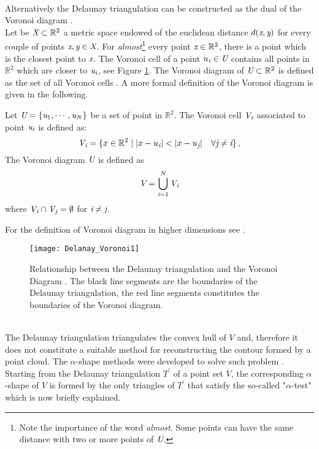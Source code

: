 \\ \indent Alternatively the Delaunay triangulation can be constructed as the dual of the Voronoi diagram \cite{fortune1992voronoi}.\\\indent Let be $\emph{X}\subset\mathbb{R}^2$ a metric space endowed of the euclidean distance $d(\textit{x}, \textit{y})$ for every couple of points $\textit{x}, \textit{y}\in \emph{X}$. For \textit{almost}\footnote{Note the importance of the word \textit{almost}. Some points can have the same distance with two or more points of $\emph{U}$.} every point $\textit{x}\in \mathbb{R}^2$, there is a point which is the closest point to $\textit{x}$. The Voronoi cell of a point $u_{\textit{i}}\in \emph{U}$ contains all points in $\mathbb{R}^2$ which are closer to $\textit{u}_{\textit{i}}$, see Figure \ref{fig:Voronoi}. The Voronoi diagram of $\emph{U}\subset \mathbb{R}^2$ is defined as the set of all Voronoi cells \cite{cazals2005conformal}. A more formal definition of the Voronoi diagram is given in the following.
\begin{defn}
Let $\emph{U}=\{\textit{u}_1,\cdots,\textit{u}_N\}$ be a set of point in $\mathbb{R}^2$. The Voronoi cell $\emph{V}_{\textit{i}}$ associated to point $\textit{u}_{\textit{i}}$ is defined as:
\begin{equation}
\emph{V}_\variabile{i}=\{x\in \mathbb{R}^2\; | \;|x-u_\variabile{i}|<|x-u_\variabile{j}| \quad \forall \variabile{j}\neq \variabile{i} \}\,,
\end{equation}
The Voronoi diagram $\emph{U}$ is defined as 
\begin{equation}
\emph{V} = \bigcup_{\textit{i}=1}^N \emph{V}_{\textit{i}}
\end{equation}
 where $\emph{V}_{\textit{i}}\cap \emph{V}_{\textit{j}}= \emptyset$ for $\textit{i}\neq\textit{j}$.
\end{defn}
For the definition of Voronoi diagram in higher dimensions see \cite{brown1979voronoi}.
\begin{figure}[t]
\centering
\texttt{[image: Delanay\_Voronoi1]}
\caption{Relationship between the Delaunay triangulation and the Voronoi Diagram \cite{Wiki4}. The black line segments are the boundaries of the Delaunay triangulation, the red line segments constitutes the boundaries of the Voronoi diagram.}
\label{fig:Voronoi}
\end{figure}
\\ \indent The Delaunay triangulation triangulates the convex hull of $V$ and, therefore it does not constitute a suitable method for reconstructing the contour formed by a point cloud. The $\alpha$-shape methods were developed to solve such problem \cite{edelsbrunner2010alpha, guo1997surface}. Starting from the Delaunay triangulation $T^\prime$ of a point set $V$, the corresponding $\alpha$-shape of $V$ is formed by the only triangles of $T^\prime$ that satisfy the so-called "$\alpha$-test" which is now briefly explained.
